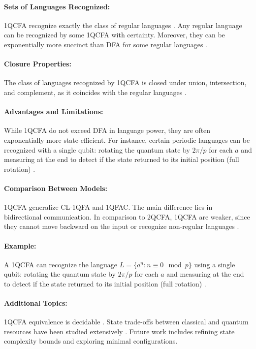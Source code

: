 \paragraph{Sets of Languages Recognized:}  
1QCFA recognize exactly the class of regular languages \cite{zheng2012one}. Any regular language can be recognized by some 1QCFA with certainty. Moreover, they can be exponentially more succinct than DFA for some regular languages \cite{xiao2021state}.

\paragraph{Closure Properties:}  
The class of languages recognized by 1QCFA is closed under union, intersection, and complement, as it coincides with the regular languages \cite{li2015hybrid}.

\paragraph{Advantages and Limitations:}  
While 1QCFA do not exceed DFA in language power, they are often exponentially more state-efficient. For instance, certain periodic languages can be recognized with a single qubit: rotating the quantum state by $2\pi/p$ for each $a$ and measuring at the end to detect if the state returned to its initial position (full rotation) \cite{xiao2021state, bianchi2014size}.

\paragraph{Comparison Between Models:}  
1QCFA generalize CL-1QFA and 1QFAC. The main difference lies in bidirectional communication. In comparison to 2QCFA, 1QCFA are weaker, since they cannot move backward on the input or recognize non-regular languages \cite{li2015hybrid}.

\paragraph{Example:}  
A 1QCFA can recognize the language $L = \{ a^n : n \equiv 0 \mod p \}$ using a single qubit: rotating the quantum state by $2\pi/p$ for each $a$ and measuring at the end to detect if the state returned to its initial position (full rotation) \cite{bianchi2014power}.

\paragraph{Additional Topics:}  
1QCFA equivalence is decidable \cite{li2015hybrid}. State trade-offs between classical and quantum resources have been studied extensively \cite{qiu2009equivalence, xiao2021state}. Future work includes refining state complexity bounds and exploring minimal configurations.


